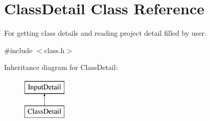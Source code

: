\hypertarget{classClassDetail}{\section{Class\-Detail Class Reference}
\label{classClassDetail}
}


For getting class details and reading project detail filled by user.  




{\ttfamily \#include $<$class.\-h$>$}

Inheritance diagram for Class\-Detail\-:\begin{figure}[H]
\begin{center}
\leavevmode
\includegraphics[height=2.000000cm]{d9/ddf/classClassDetail}
\end{center}
\end{figure}
